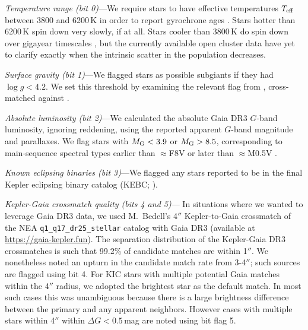 \documentclass[11pt,twocolumn,tighten]{aastex63}
\begin{document}
{\it Temperature range (bit 0)}---We require stars to have effective
temperatures $T_{\rm eff}$ between 3800 and 6200\,K in order to report
gyrochrone ages \citep{Bouma_2023}.   Stars hotter than 6200\,K spin
down very slowly, if at all.  Stars cooler than 3800\,K do spin down
over gigayear timescales
\citep{2016ApJ...821...93N,2023ApJ...954L..50E,2024arXiv240312129C},
but the currently available open cluster data have yet to clarify
exactly when the intrinsic scatter in the population decreases.

{\it Surface gravity (bit 1)}---We flagged stars as possible subgiants
if they had $\log g < 4.2$.  We set this threshold by examining the
relevant flag from \citet{berger_2018_radii_evolnstates},
cross-matched against \citet{Berger_2020a_catalog}.

{\it Absolute luminosity (bit 2)}---We calculated the absolute Gaia
DR3 $G$-band luminosity, ignoring reddening, using the reported
apparent $G$-band magnitude and parallaxes.  We flag stars with
$M_{\rm G} < 3.9$ or $M_{\rm G} > 8.5$, corresponding to main-sequence
spectral types earlier than $\approx$F8V or later than $\approx$M0.5V
\citep{Pecaut_2013}.

{\it Known eclipsing binaries (bit 3)}---We flagged any stars reported
to be in the final Kepler eclipsing binary catalog (KEBC;
\citealt{2016AJ....151...68K}).

{\it Kepler-Gaia crossmatch quality (bits 4 and 5)}--- In situations
where we wanted to leverage Gaia DR3 data, we used M.~Bedell's 4$''$
Kepler-to-Gaia crossmatch %
of the NEA \texttt{q1\_q17\_dr25\_stellar} catalog with Gaia DR3
(available at \url{https://gaia-kepler.fun}).  The
separation distribution of the Kepler-Gaia DR3 crossmatches is such
that 99.2\% of candidate matches are within 1$''$.   We nonetheless
noted an upturn in the candidate match rate from 3-4$''$; such sources
are flagged using bit 4.  For KIC stars with multiple potential Gaia
matches within the 4$''$ radius, we adopted the brightest star as the
default match.  In most such cases this was unambiguous because there
is a large brightness difference between the primary and any apparent
neighbors.  However cases with multiple stars within 4$''$ within
$\Delta G$$<$$0.5$\,mag are noted using bit flag 5.  
\end{document}
